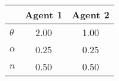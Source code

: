 \begin{tiny}\begin{tabular}{|l|c|c|}
\hline
&\textbf{Agent 1}&\textbf{Agent 2}\\\hline
\textbf{$\theta$}&2.00&1.00\\\hline
\textbf{$\alpha$}&0.25&0.25\\\hline
\textbf{$n$}&0.50&0.50\\\hline
\end{tabular}
\end{tiny}